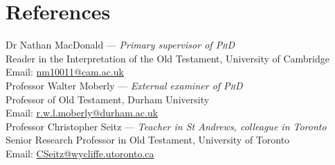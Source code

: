 \documentclass[11pt]{article}
\newcommand{\years}[1]{\marginnote{\footnotesize #1}}
\begin{document}



\section*{References}

Dr Nathan MacDonald --- \emph{Primary supervisor of \textsc{PhD}}\\
Reader in the Interpretation of the Old Testament, University of Cambridge\\
Email: \href{mailto:nm10011@cam.ac.uk}{nm10011@cam.ac.uk}\\

Professor Walter Moberly --- \emph{External examiner of \textsc{PhD}}\\
Professor of Old Testament, Durham University\\
Email: \href{mailto:r.w.l.moberly@durham.ac.uk}{r.w.l.moberly@durham.ac.uk}\\

Professor Christopher Seitz --- \emph{Teacher in St Andrews, colleague in Toronto}\\
Senior Research Professor in Old Testament, University of Toronto\\
Email: \href{mailto:CSeitz@wycliffe.utoronto.ca}{CSeitz@wycliffe.utoronto.ca}\\
\end{document}

